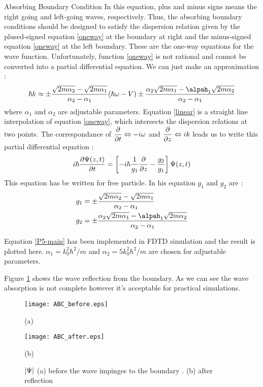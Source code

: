 \begin{homeworkProblem}
\begin{homeworkSection}{Absorbing Boundary Condition}
In this equation, plus and minus signs means the right going and left-going waves, respectively. Thus, the absorbing boundary conditions should be designed to satisfy the dispersion relation given by the plused-signed equation \eqref{oneway} at the boundary at right and the minus-signed equation \eqref{oneway} at the left boundary. These are the one-way equations   for the wave function. Unfortunately, function \eqref{oneway} is not rational and connot be converted into a partial differential equation. We can just make an approximation \cite{shibata}:
\begin{equation}\label{linear}
\hbar k\approx\pm\frac{\sqrt{2m\alpha_2}-\sqrt{2m\alpha_1}}{\alpha_2-\alpha_1}(\hbar\omega-V)
\pm\frac{\alpha_2\sqrt{2m\alpha_1}-\alpah_1\sqrt{2m\alpha_2}}{\alpha_2-\alpha_1}
\end{equation}  
where $\alpha_1$ and $\alpha_2$ are adjustable parameters. Equation \eqref{linear} is a straight line interpolation of equation \eqref{oneway}, which intersects the dispersion relations at two points. The correspondance of $\dfrac{\partial}{\partial t}\Leftrightarrow-i\omega$ and $\dfrac{\partial}{\partial z}\Leftrightarrow ik$ leads us to write this partial differential equation \cite{shibata}:
\begin{equation}\label{P5-main}
i\hbar\dfrac{\partial \Psi(z,t)}{\partial t}=\left[-i\hbar\frac{1}{g_1}\dfrac{\partial}{\partial z}-\frac{g_2}{g_1}\right]\Psi(z,t)
\end{equation}  
This equation has be written for free particle. In his equation $g_1$ and $g_2$ are \cite{shibata}:
\begin{align}
&g_1=\pm\frac{\sqrt{2m\alpha_2}-\sqrt{2m\alpha_1}}{\alpha_2-\alpha_1}\\
&g_2=\pm\frac{\alpha_2\sqrt{2m\alpha_1}-\alpah_1\sqrt{2m\alpha_2}}{\alpha_2-\alpha_1}
\end{align} 

Equation \eqref{P5-main} has been implemented in FDTD simulation and the result is plotted here. $\alpha_1=k^2_0\hbar^2/{m}$ and $\alpha_2 =5k_0^2\hbar^2/m$ are chosen for adjustable parameters.  

Figure \ref{fig:ABC} shows the wave reflection from the boundary. As we can see the wave absorption is not complete however it's acceptable for practical simulations. 


\begin{figure}[h]
\begin{minipage}[b]{1\linewidth}
\centering
\texttt{[image: ABC\_before.eps]}
\centerline{\small (a) }
\end{minipage}
\begin{minipage}[b]{1\linewidth}
\centering
\texttt{[image: ABC\_after.eps]}
\centerline{\small (b) }
\end{minipage}
\caption { \small $\lvert\Psi\rvert$ (a) before the wave impinges to the boundary . (b)  after reflection} 
\label{fig:ABC}
\end{figure} 


\end{homeworkSection}
\end{homeworkProblem}
